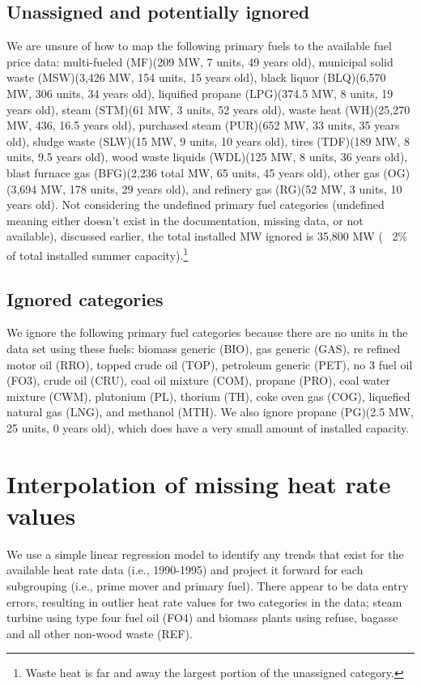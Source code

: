 \documentclass[10pt]{report}
\begin{document}
\subsection{Unassigned and potentially ignored}
We are unsure of how to map the following primary fuels to the available fuel price data: multi-fueled (MF)(209 MW, 7 units, 49 years old), municipal solid waste (MSW)(3,426 MW, 154 units, 15 years old), black liquor (BLQ)(6,570 MW, 306 units, 34 years old), liquified propane (LPG)(374.5 MW, 8 units, 19 years old), steam (STM)(61 MW, 3 units, 52 years old), waste heat (WH)(25,270 MW, 436, 16.5 years old), purchased steam (PUR)(652 MW, 33 units, 35 years old), sludge waste (SLW)(15 MW, 9 units, 10 years old), tires (TDF)(189 MW, 8 units, 9.5 years old), wood waste liquids (WDL)(125 MW, 8 units, 36 years old), blast furnace gas (BFG)(2,236 total MW, 65 units, 45 years old), other gas (OG)(3,694 MW, 178 units, 29 years old), and refinery gas (RG)(52 MW, 3 units, 10 years old). 
Not considering the undefined primary fuel categories (undefined meaning either doesn't exist in the documentation, missing data, or not available), discussed earlier, the total installed MW ignored is 35,800 MW (~ 2\% of total installed summer capacity).\footnote{Waste heat is far and away the largest portion of the unassigned category.} 

\subsection{Ignored categories}
We ignore the following primary fuel categories because there are no units in the data set using these fuels: biomass generic (BIO), gas generic (GAS), re refined motor oil (RRO), topped crude oil (TOP), petroleum generic (PET), no 3 fuel oil (FO3), crude oil (CRU), coal oil mixture (COM), propane (PRO), coal water mixture (CWM), plutonium (PL), thorium (TH), coke oven gas (COG), liquefied natural gas (LNG), and methanol (MTH). We also ignore propane (PG)(2.5 MW, 25 units, 0 years old), which does have a very small amount of installed capacity. 

\section{Interpolation of missing heat rate values}
We use a simple linear regression model to identify any trends that exist for the available heat rate data (i.e., 1990-1995) and project it forward for each subgrouping (i.e., prime mover and primary fuel). 
There appear to be data entry errors, resulting in outlier heat rate values for two categories in the data; steam turbine using type four fuel oil (FO4) and biomass plants using refuse, bagasse and all other non-wood waste (REF). 
\end{document}
